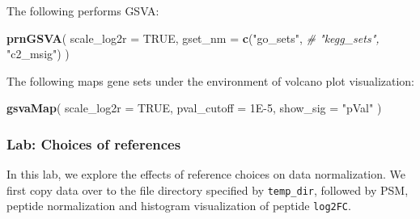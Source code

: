 \documentclass[]{article}
\newenvironment{Shaded}{\begin{snugshade}}{\end{snugshade}}
\newcommand{\CommentTok}[1]{\textcolor[rgb]{0.56,0.35,0.01}{\textit{#1}}}
\newcommand{\DataTypeTok}[1]{\textcolor[rgb]{0.13,0.29,0.53}{#1}}
\newcommand{\FloatTok}[1]{\textcolor[rgb]{0.00,0.00,0.81}{#1}}
\newcommand{\KeywordTok}[1]{\textcolor[rgb]{0.13,0.29,0.53}{\textbf{#1}}}
\newcommand{\NormalTok}[1]{#1}
\newcommand{\OtherTok}[1]{\textcolor[rgb]{0.56,0.35,0.01}{#1}}
\newcommand{\StringTok}[1]{\textcolor[rgb]{0.31,0.60,0.02}{#1}}
\begin{document}
The following performs GSVA:

\begin{Shaded}
\begin{Highlighting}[]
\KeywordTok{prnGSVA}\NormalTok{(}
  \DataTypeTok{scale_log2r =} \OtherTok{TRUE}\NormalTok{, }
  \DataTypeTok{gset_nm =} \KeywordTok{c}\NormalTok{(}\StringTok{"go_sets"}\NormalTok{, }
              \CommentTok{# "kegg_sets", }
              \StringTok{"c2_msig"}\NormalTok{)}
\NormalTok{)}
\end{Highlighting}
\end{Shaded}

The following maps gene sets under the environment of volcano plot
visualization:

\begin{Shaded}
\begin{Highlighting}[]
\KeywordTok{gsvaMap}\NormalTok{(}
  \DataTypeTok{scale_log2r =} \OtherTok{TRUE}\NormalTok{, }
  \DataTypeTok{pval_cutoff =} \FloatTok{1E-5}\NormalTok{, }
  \DataTypeTok{show_sig =} \StringTok{"pVal"}
\NormalTok{)}
\end{Highlighting}
\end{Shaded}

\hypertarget{lab-choices-of-references}{%
\subsubsection{Lab: Choices of
references}\label{lab-choices-of-references}}

In this lab, we explore the effects of reference choices on data
normalization. We first copy data over to the file directory specified
by \texttt{temp\_dir}, followed by PSM, peptide normalization and
histogram visualization of peptide \texttt{log2FC}.
\end{document}
